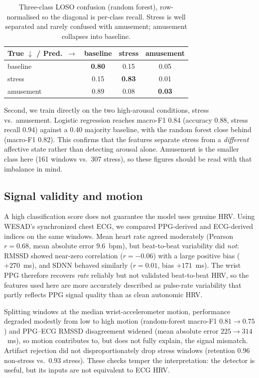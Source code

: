 \documentclass[conference]{IEEEtran}
\begin{document}
\begin{table}[t]
  \centering
  \caption{Three-class LOSO confusion (random forest), row-normalised so the diagonal is
  per-class recall. Stress is well separated and rarely confused with amusement; amusement
  collapses into baseline.}
  \label{tab:conf3}
  \begin{tabular}{@{}lccc@{}}
    \toprule
    True $\downarrow$ / Pred.\ $\rightarrow$ & baseline & stress & amusement \\
    \midrule
    baseline  & \textbf{0.80} & 0.15 & 0.05 \\
    stress    & 0.15 & \textbf{0.83} & 0.01 \\
    amusement & 0.89 & 0.08 & \textbf{0.03} \\
    \bottomrule
  \end{tabular}
\end{table}

Second, we train directly on the two high-arousal conditions, stress vs.\ amusement.
Logistic regression reaches macro-F1 0.84 (accuracy 0.88, stress recall 0.94) against a
0.40 majority baseline, with the random forest close behind (macro-F1 0.82). This confirms
that the features separate stress from a \emph{different} affective state rather than
detecting arousal alone. Amusement is the smaller class here (161 windows vs.\ 307 stress),
so these figures should be read with that imbalance in mind.

\subsection{Signal validity and motion}
\label{sec:validity}
A high classification score does not guarantee the model uses genuine HRV. Using
WESAD's synchronized chest ECG, we compared PPG-derived and ECG-derived indices on
the same windows. Mean heart rate agreed moderately (Pearson $r = 0.68$, mean
absolute error $9.6$~bpm), but beat-to-beat variability did \emph{not}: RMSSD showed
near-zero correlation ($r = -0.06$) with a large positive bias ($+270$~ms), and SDNN
behaved similarly ($r = 0.01$, bias $+171$~ms). The wrist PPG therefore recovers
\emph{rate} reliably but not validated beat-to-beat HRV, so the features used here are
more accurately described as pulse-rate variability that partly reflects PPG signal
quality than as clean autonomic HRV.

Splitting windows at the median wrist-accelerometer motion, performance degraded
modestly from low to high motion (random-forest macro-F1 $0.81 \rightarrow 0.75$) and
PPG--ECG RMSSD disagreement widened (mean absolute error $225 \rightarrow 314$~ms), so
motion contributes to, but does not fully explain, the signal mismatch. Artifact
rejection did not disproportionately drop stress windows (retention $0.96$ non-stress
vs.\ $0.93$ stress). These checks temper the interpretation: the detector is useful,
but its inputs are not equivalent to ECG HRV.
\end{document}
